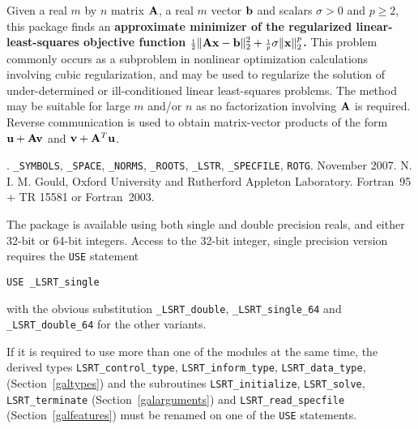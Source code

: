 \documentclass{galahad}
\newcommand{\packagename}{LS\-RT}
\newcommand{\fullpackagename}{\libraryname\_\packagename}
\begin{document}
\galheader


\galsummary
Given a real $m$ by $n$ matrix ${\mathbf{A}}$, a real $m$ vector ${\mathbf{b}}$ and
scalars $\sigma>0$ and $p \geq 2$, this package finds an
{\bf approximate minimizer of the regularized linear-least-squares
objective function
${\scriptstyle \frac{1}{2}}\| {\mathbf{A}} {\mathbf{x}} - {\mathbf{b}}\|_2^2 + {\scriptstyle \frac{1}{p}} \sigma \| {\mathbf{x}} \|_2^p$.}
This problem commonly occurs as a subproblem in nonlinear
optimization calculations involving cubic regularization,
and may be used to regularize the solution
of under-determined or ill-conditioned linear least-squares problems.
The method may be suitable for large $m$ and/or $n$ as no factorization
involving ${\mathbf{A}}$ is required. Reverse communication is used to obtain
matrix-vector products of the form ${\mathbf{u}} + {\mathbf{A}} {\mathbf{v}}$ and
${\mathbf{v}} + {\mathbf{A}}^T {\mathbf{u}}$.


\galattributes
\galversions{\tt  \fullpackagename\_single, \fullpackagename\_double}.
\galuses
{\tt \libraryname\_SY\-M\-BOLS},
{\tt \libraryname\_SPACE}, {\tt \libraryname\_\-NORMS},
{\tt \libraryname\_ROOTS}, {\tt \libraryname\_LSTR},
{\tt \libraryname\_SPECFILE},
{\tt *ROTG}.
\galdate November 2007.
\galorigin N. I. M. Gould, Oxford University and Rutherford Appleton Laboratory.
\gallanguage Fortran~95 + TR 15581 or Fortran~2003.


\galhowto

The package is available using both single and double precision reals, 
and either 32-bit or 64-bit integers. Access to the 32-bit integer,
single precision version requires the {\tt USE} statement
\medskip

\hspace{8mm} {\tt USE \fullpackagename\_single}

\medskip
\noindent
with the obvious substitution {\tt \fullpackagename\_double},
{\tt \fullpackagename\_single\_64} and 
{\tt \fullpackagename\_double\_64} for the other variants.

\noindent
If it is required to use more than one of the modules at the same time, 
the derived types
{\tt \packagename\_control\_type}, {\tt \packagename\_inform\_type},
{\tt \packagename\_data\_type},
(Section~\ref{galtypes})
and the subroutines
{\tt \packagename\_initialize},
{\tt \packagename\_solve}, {\tt \packagename\_terminate}
(Section~\ref{galarguments})
and
{\tt \packagename\_read\_specfile}
(Section~\ref{galfeatures})
must be renamed on one of the {\tt USE} statements.
\end{document}
